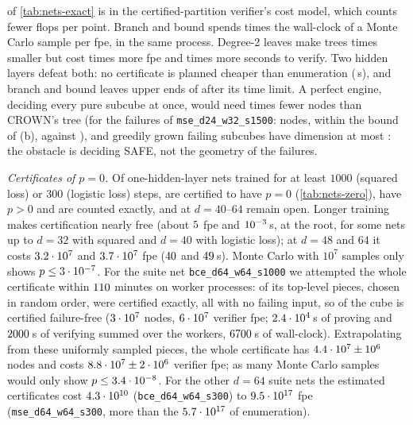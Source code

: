 of \cref{tab:nets-exact} is in the certified-partition verifier's cost model, which
counts fewer flops per point. Branch and bound spends \nnBabWallFactor{} times the
wall-clock of a Monte Carlo sample per fpe, in the same process. Degree-2 leaves make trees \nnQuadNodeRatio{} times
smaller but cost \nnQuadFpeRatio{} times more fpe and \nnQuadSecRatio{} times more
seconds to verify. Two hidden layers defeat both: no certificate is planned cheaper
than enumeration (\nnDeepEnumSec{}\,s), and branch and bound leaves upper ends of
\nnBabDeepHi{} after its time limit. A perfect engine, deciding every pure subcube at
once, would need \nnOracleRatio{} times fewer nodes than CROWN's tree (for the
\nnSmallDF{} failures of \texttt{mse\_d24\_w32\_s1500}: \nnOracleOneFiveNodes{} nodes,
within the bound \nnOracleOneFiveBound{} of (b), against \nnCrownOneFiveNodes{}), and
greedily grown failing subcubes have dimension at most \nnMaxFailDim{}: the obstacle is
deciding SAFE, not the geometry of the failures.

\emph{Certificates of $p=0$.} Of \nnZeroNets{} one-hidden-layer nets trained for at
least $1000$ (squared loss) or $300$ (logistic loss) steps, \nnZeroZero{} are certified
to have $p=0$ (\cref{tab:nets-zero}), \nnZeroPos{} have $p>0$ and are counted exactly,
and \nnZeroOpen{} at $d=40$--$64$ remain open. Longer
training makes certification nearly free (about $5$ fpe and $10^{-3}$\,s, at
the root, for some nets up to $d=32$ with squared and $d=40$ with logistic loss); at $d=48$ and $64$ it costs $3.2\cdot10^{7}$
and $3.7\cdot10^{7}$ fpe ($40$ and $49$\,s). Monte
Carlo with $10^7$ samples only shows $p\le3\cdot10^{-7}$. For the suite net
\texttt{bce\_d64\_w64\_s1000} we attempted the whole certificate within
$110$ minutes on \nnSixFourWorkers{} worker processes: \nnSixFourDone{} of its \nnSixFourTotal{} top-level pieces, chosen in
random order, were certified exactly, all with no failing input, so \nnSixFourFrac{} of
the cube is certified failure-free ($3\cdot10^{7}$ nodes, $6\cdot10^{7}$ verifier
fpe; $2.4\cdot10^{4}$\,s of proving and $2000$\,s of verifying summed
over the workers, $6700$\,s of wall-clock). Extrapolating from these uniformly
sampled pieces, the whole certificate has $4.4\cdot10^{7}\pm10^{6}$
nodes and costs $8.8\cdot10^{7}\pm2\cdot10^{6}$ verifier fpe; as many Monte
Carlo samples would only show $p\le3.4\cdot10^{-8}$. For the other $d=64$ suite nets
the estimated certificates cost $4.3\cdot10^{10}$ (\texttt{bce\_d64\_w64\_s300}) to $9.5\cdot10^{17}$ fpe
(\texttt{mse\_d64\_w64\_s300}, more than the $5.7\cdot10^{17}$ of enumeration).

